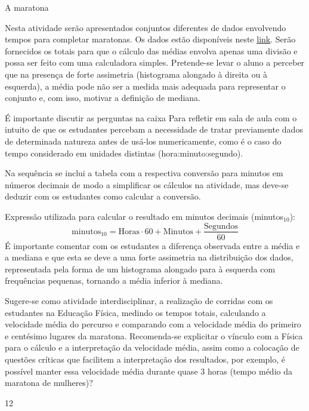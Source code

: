 \begin{sugestions}{A maratona}
{
Nesta atividade serão apresentados conjuntos diferentes de dados envolvendo tempos para completar maratonas. Os dados estão disponíveis neste \href{https://www.geogebra.org/m/ZhqKD9Nz}{link}. Serão fornecidos os totais para que o cálculo das médias envolva apenas uma divisão e possa ser feito com uma calculadora simples. Pretende-se levar o aluno a perceber que na presença de forte assimetria (histograma alongado à direita ou à esquerda), a média pode não ser a medida mais adequada para representar o conjunto e, com isso, motivar a definição de mediana.

É importante discutir as perguntas na caixa Para refletir em sala de aula com o intuito de que os estudantes percebam a necessidade de tratar previamente dados de determinada natureza antes de usá-los numericamente, como é o caso do tempo considerado em unidades distintas (hora:minuto:segundo).

Na sequência se inclui a tabela com a respectiva conversão para minutos em números decimais de modo a simplificar os cálculos na atividade, mas deve-se deduzir com os estudantes como calcular a conversão.

Expressão utilizada para calcular o resultado em minutos decimais (minutos$_{10}$):
\begin{equation*}
\text{minutos}_{10}=\text{Horas}\cdot60+\text{Minutos}+\frac{\text{Segundos}}{60}
\end{equation*}
É importante comentar com os estudantes a diferença observada entre a média e a mediana e que esta se deve a uma forte assimetria na distribuição dos dados, representada pela forma de um histograma alongado para à esquerda com frequências pequenas, tornando a média inferior à mediana.

Sugere-se como atividade interdisciplinar, a realização de corridas com os estudantes na Educação Física, medindo os tempos totais, calculando a velocidade média do percurso e comparando com a velocidade média do primeiro e centésimo lugares da maratona. Recomenda-se explicitar o vínculo com a Física para o cálculo e a interpretação da velocidade média, assim como a colocação de questões críticas que facilitem a interpretação dos resultados, por exemplo, é possível manter essa velocidade média durante quase $3$ horas (tempo médio da maratona de mulheres)?
}{1}{2}
\end{sugestions}
\clearmargin

